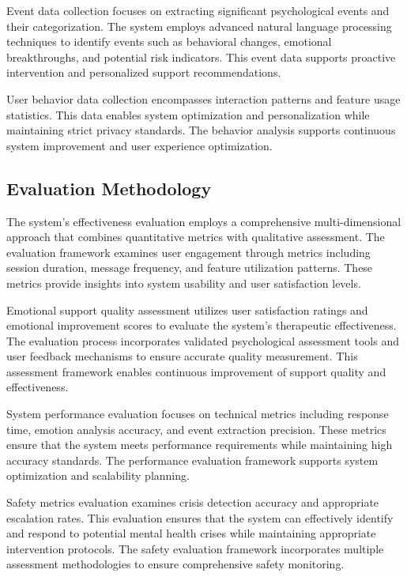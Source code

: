 Event data collection focuses on extracting significant psychological events and their categorization. The system employs advanced natural language processing techniques to identify events such as behavioral changes, emotional breakthroughs, and potential risk indicators. This event data supports proactive intervention and personalized support recommendations.

User behavior data collection encompasses interaction patterns and feature usage statistics. This data enables system optimization and personalization while maintaining strict privacy standards. The behavior analysis supports continuous system improvement and user experience optimization.

\subsection{Evaluation Methodology}

The system's effectiveness evaluation employs a comprehensive multi-dimensional approach that combines quantitative metrics with qualitative assessment. The evaluation framework examines user engagement through metrics including session duration, message frequency, and feature utilization patterns. These metrics provide insights into system usability and user satisfaction levels.

Emotional support quality assessment utilizes user satisfaction ratings and emotional improvement scores to evaluate the system's therapeutic effectiveness. The evaluation process incorporates validated psychological assessment tools and user feedback mechanisms to ensure accurate quality measurement. This assessment framework enables continuous improvement of support quality and effectiveness.

System performance evaluation focuses on technical metrics including response time, emotion analysis accuracy, and event extraction precision. These metrics ensure that the system meets performance requirements while maintaining high accuracy standards. The performance evaluation framework supports system optimization and scalability planning.

Safety metrics evaluation examines crisis detection accuracy and appropriate escalation rates. This evaluation ensures that the system can effectively identify and respond to potential mental health crises while maintaining appropriate intervention protocols. The safety evaluation framework incorporates multiple assessment methodologies to ensure comprehensive safety monitoring. 